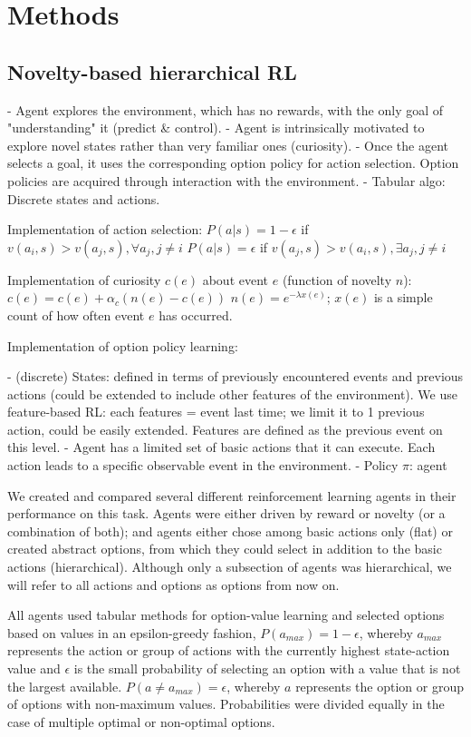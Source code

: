 \documentclass{article}
\begin{document}
\section{Methods}

\subsection{Novelty-based hierarchical RL}

- Agent explores the environment, which has no rewards, with the only goal of "understanding" it (predict \& control).
- Agent is intrinsically motivated to explore novel states rather than very familiar ones (curiosity).
- Once the agent selects a goal, it uses the corresponding option policy for action selection. Option policies are acquired through interaction with the environment.
- Tabular algo: Discrete states and actions.

Implementation of action selection:
$P(a|s) = 1 - \epsilon$ if $v(a_i, s) > v(a_j, s), \forall a_j, j \neq i$
$P(a|s) = \epsilon$ if $v(a_j, s) > v(a_i, s), \exists a_j, j \neq i$

Implementation of curiosity $c(e)$ about event $e$ (function of novelty $n$):
$c(e) = c(e) + \alpha_{c} (n(e) - c(e))$
$n(e) = e^{-\lambda x(e)}$; $x(e)$ is a simple count of how often event $e$ has occurred.

Implementation of option policy learning:


- (discrete) States: defined in terms of previously encountered events and previous actions (could be extended to include other features of the environment). We use feature-based RL: each features = event last time; we limit it to 1 previous action, could be easily extended. Features are defined as the previous event on this level.
- Agent has a limited set of basic actions that it can execute. Each action leads to a specific observable event in the environment.
- Policy $\pi$: agent 


We created and compared several different reinforcement learning agents in their performance on this task. Agents were either driven by reward or novelty (or a combination of both); and agents either chose among basic actions only (flat) or created abstract options, from which they could select in addition to the basic actions (hierarchical). Although only a subsection of agents was hierarchical, we will refer to all actions and options as options from now on.

All agents used tabular methods for option-value learning and selected options based on values in an epsilon-greedy fashion, $P(a_{max}) = 1 - \epsilon$, whereby $a_{max}$ represents the action or group of actions with the currently highest state-action value and $\epsilon$ is the small probability of selecting an option with a value that is not the largest available. $P(a \neq a_{max}) = \epsilon$, whereby $a$ represents the option or group of options with non-maximum values. Probabilities were divided equally in the case of multiple optimal or non-optimal options. 
\end{document}
